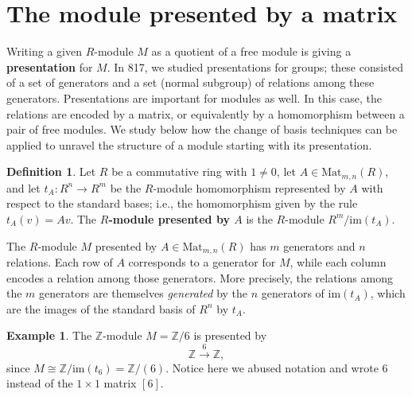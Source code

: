\documentclass[12pt]{report}
\numberwithin{equation}{section}
\numberwithin{theorem}{chapter}
\theoremstyle{definition}
\newtheorem{definition}[theorem]{Definition}
\newtheorem{example}[theorem]{Example}
\newtheorem*{basic properties}{Basic Properties}
\newtheorem*{Important Remark}{Important Remark}
\newcommand{\df}[1]{{\bf #1}\index{#1}}
\begin{document}
\section{The module presented by a matrix}

Writing a given $R$-module $M$ as a quotient of a free module is giving a {\bf presentation} for $M$.
In 817, we studied presentations for groups; these consisted of a set of generators and a set (normal subgroup) of relations among these generators. Presentations are important for modules as well. In this case, the relations are encoded by a matrix, or equivalently by a homomorphism between a pair of free modules. We study below how the change of basis techniques can be applied to unravel the structure of a module starting with its presentation.



  
\begin{definition} 
Let $R$ be a commutative ring with $1 \neq 0$, let $A \in \mathrm{Mat}_{m,n}(R)$, and let $t_A\!: R^n \to R^m$ be the $R$-module homomorphism represented by $A$ with respect to the standard bases; i.e., the homomorphism given by the rule $t_A(v)=Av$. The \df{$R$-module presented by $A$} is the $R$-module $R^m/\mathrm{im}(t_A)$.
 \end{definition}
 
 
The $R$-module $M$ presented by $A \in \mathrm{Mat}_{m,n}(R)$ has $m$ generators and $n$ relations. Each row of $A$ corresponds to a generator for $M$, while each column encodes a relation among those generators. More precisely, the relations among the $m$ generators are themselves \emph{generated} by the $n$ generators of $\mathrm{im}(t_A)$, which are the images of the standard basis of $R^n$ by $t_A$.
 
 
\begin{example}
	The $\mathbb{Z}$-module $M = \mathbb{Z}/6$ is presented by 
	$$\mathbb{Z} \xrightarrow{6} \mathbb{Z},$$
	since $M \cong \mathbb{Z}/ \mathrm{im}(t_6) = \mathbb{Z}/(6)$. Notice here we abused notation and wrote $6$ instead of the $1 \times 1$ matrix $\left[ 6 \right]$.
\end{example}
\end{document}
